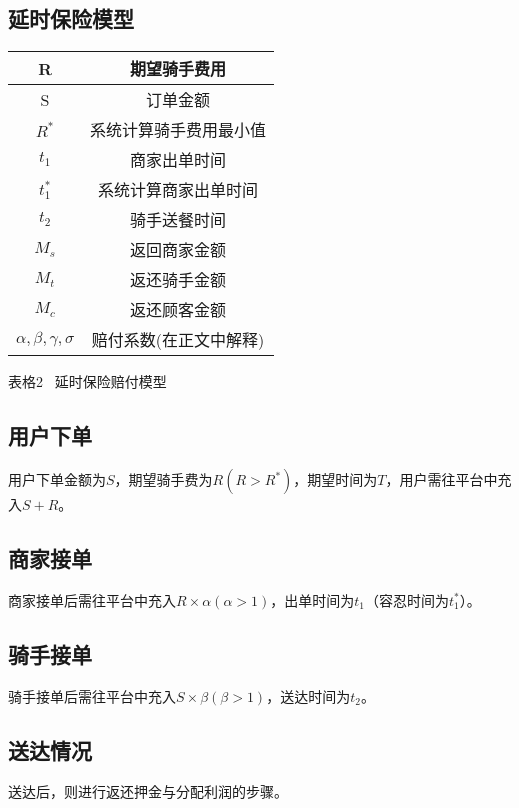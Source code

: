 \documentclass[UTF8]{ctexart}
\newcommand\picfig[1]{\centerline{\small \heiti #1 \songti }}
\begin{document}
\begin{multicols}{2}
  \section{延时保险模型}
  \begin{table}[H]
    \centering
    \begin{tabular}{|c |c|}
      \hline
      R               & 期望骑手费用           \\ \hline
      S               & 订单金额           \\ \hline
      $R^{*}$         & 系统计算骑手费用最小值           \\ \hline
      $t_1$           & 商家出单时间           \\ \hline
      $t_1^{*}$       & 系统计算商家出单时间           \\ \hline
      $t_2$           & 骑手送餐时间       \\ \hline
      $M_s$           & 返回商家金额           \\ \hline
      $M_t$           & 返还骑手金额           \\ \hline
      $M_c$           & 返还顾客金额           \\ \hline
      $\alpha,\beta,\gamma,\sigma$           & 赔付系数(在正文中解释)           \\ \hline
    \end{tabular}
  \end{table}
  \picfig{表格2 \  延时保险赔付模型}
  \subsection{用户下单}
  用户下单金额为$S$，期望骑手费为$R(R>R^{*})$，期望时间为$T$，用户需往平台中充入$S+R$。
  \subsection{商家接单}
  商家接单后需往平台中充入$R×\alpha(\alpha>1)$，出单时间为$t_1$（容忍时间为$t_1^{*}$）。
  \subsection{骑手接单}
     骑手接单后需往平台中充入$S×\beta(\beta>1)$，送达时间为$t_2$。
  \subsection{送达情况}
  \indent 送达后，则进行返还押金与分配利润的步骤。

\end{multicols}
\end{document}
